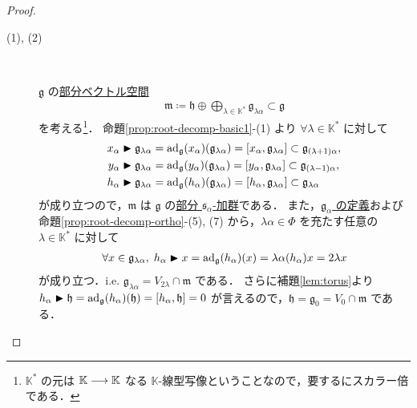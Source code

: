 \documentclass[rep_main]{subfiles}
\begin{document}
\begin{proof}
	\begin{description}
		\item[(1), (2)]　
		
		$\mathfrak{g}$ の\underline{部分ベクトル空間}
		\begin{align}
			\label{eq:prop2.5.4-1}
			\mathfrak{m} \coloneqq \mathfrak{h} \oplus \bigoplus_{\lambda \in \mathbb{K}^*} \mathfrak{g}_{\lambda\alpha} \subset \mathfrak{g}
		\end{align}
		を考える\footnote{$\mathbb{K}^*$ の元は $\mathbb{K} \longrightarrow \mathbb{K}$ なる $\mathbb{K}$-線型写像ということなので，要するにスカラー倍である．}．
		命題\ref{prop:root-decomp-basic1}-(1) より $\forall \lambda \in \mathbb{K}^*$ に対して
		\begin{align}
			x_\alpha \btr \mathfrak{g}_{\lambda\alpha} &= \ad_{\mathfrak{g}}(x_\alpha) (\mathfrak{g}_{\lambda\alpha}) = \comm{x_\alpha}{\mathfrak{g}_{\lambda\alpha}} \subset \mathfrak{g}_{(\lambda+1)\alpha}, \\
			y_\alpha \btr \mathfrak{g}_{\lambda\alpha} &= \ad_{\mathfrak{g}}(y_\alpha) (\mathfrak{g}_{\lambda\alpha}) = \comm{y_\alpha}{\mathfrak{g}_{\lambda\alpha}} \subset \mathfrak{g}_{(\lambda-1)\alpha}, \\
			h_\alpha \btr \mathfrak{g}_{\lambda\alpha} &= \ad_{\mathfrak{g}}(h_\alpha) (\mathfrak{g}_{\lambda\alpha}) = \comm{h_\alpha}{\mathfrak{g}_{\lambda\alpha}} \subset \mathfrak{g}_{\lambda\alpha}
		\end{align}
		が成り立つので，$\mathfrak{m}$ は $\mathfrak{g}$ の\hyperref[def:sub-g-module]{部分 $\mathfrak{s}_\alpha$-加群}である．
		また，\hyperref[def:ga]{$\mathfrak{g}_\alpha$ の定義}および命題\ref{prop:root-decomp-ortho}-(5), (7) から，$\lambda\alpha \in \Phi$ を充たす任意の $\lambda \in \mathbb{K}^*$ に対して
		\begin{align}
			\forall x \in \mathfrak{g}_{\lambda \alpha},\; h_\alpha \blacktriangleright x = \operatorname{ad}_{\mathfrak{g}}(h_\alpha)(x) = \lambda \alpha(h_\alpha) x = 2\lambda x
		\end{align}
		が成り立つ．i.e. $\mathfrak{g}_{\lambda\alpha} = V_{2\lambda} \cap \mathfrak{m}$ である．
		さらに補題\ref{lem:torus}より $h_\alpha \btr \mathfrak{h} = \ad_{\mathfrak{g}}(h_\alpha)(\mathfrak{h}) = \comm{h_\alpha}{\mathfrak{h}} = 0$ 
		が言えるので，$\mathfrak{h} = \mathfrak{g}_0 = V_0 \cap \mathfrak{m}$ である．


\end{description}
\end{proof}
\end{document}

